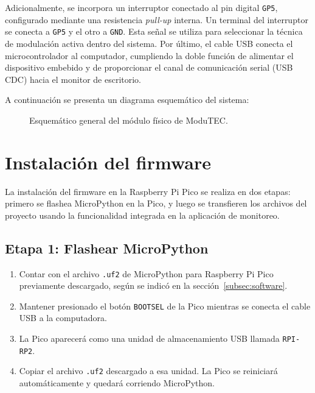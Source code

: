 \documentclass[12pt,letterpaper]{report}
\begin{document}
Adicionalmente, se incorpora un interruptor conectado al pin digital \texttt{GP5},
configurado mediante una resistencia \textit{pull-up} interna. Un terminal del interruptor
se conecta a \texttt{GP5} y el otro a \texttt{GND}. Esta señal se utiliza para seleccionar
la técnica de modulación activa dentro del sistema. Por último, el cable USB conecta el
microcontrolador al computador, cumpliendo la doble función de alimentar el dispositivo embebido
y de proporcionar el canal de comunicación serial (USB CDC) hacia el monitor de escritorio.

A continuación se presenta un diagrama esquemático del sistema:

\begin{figure}[H]
    \centering
    \resizebox{0.60\textwidth}{!}{
    
    }
    \caption{Esquemático general del módulo físico de ModuTEC.}
    \label{fig:pico_schematic}
\end{figure}


\section{Instalación del firmware}

La instalación del firmware en la Raspberry Pi Pico se realiza en dos etapas: primero
se flashea MicroPython en la Pico, y luego se transfieren los archivos del proyecto
usando la funcionalidad integrada en la aplicación de monitoreo.

\subsection{Etapa 1: Flashear MicroPython}

\begin{enumerate}
  \item Contar con el archivo \texttt{.uf2} de MicroPython para Raspberry Pi Pico previamente descargado,
        según se indicó en la sección~\ref{subsec:software}.
  \item Mantener presionado el botón \texttt{BOOTSEL} de la Pico mientras se conecta el
        cable USB a la computadora.
  \item La Pico aparecerá como una unidad de almacenamiento USB llamada
        \texttt{RPI-RP2}.
  \item Copiar el archivo \texttt{.uf2} descargado a esa unidad. La Pico se reiniciará
        automáticamente y quedará corriendo MicroPython.
\end{enumerate}
\end{document}
